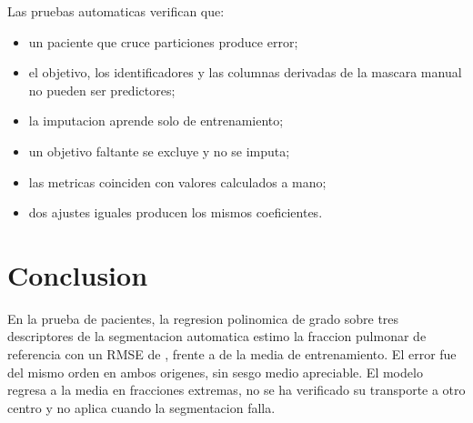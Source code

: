 \documentclass[11pt,a4paper]{article}
\begin{document}
Las pruebas automaticas verifican que:
\begin{itemize}
    \item un paciente que cruce particiones produce error;
    \item el objetivo, los identificadores y las columnas derivadas de la
    mascara manual no pueden ser predictores;
    \item la imputacion aprende solo de entrenamiento;
    \item un objetivo faltante se excluye y no se imputa;
    \item las metricas coinciden con valores calculados a mano;
    \item dos ajustes iguales producen los mismos coeficientes.
\end{itemize}

\section{Conclusion}

En la prueba de \ModNTest{} pacientes, la regresion polinomica de grado
\ModGrado{} sobre tres descriptores de la segmentacion automatica estimo la
fraccion pulmonar de referencia con un RMSE de \ModRMSETest{}, frente a
\ModRMSETestBase{} de la media de entrenamiento. El error fue del mismo orden en
ambos origenes, sin sesgo medio apreciable. El modelo regresa a la media en
fracciones extremas, no se ha verificado su transporte a otro centro y no
aplica cuando la segmentacion falla.
\end{document}
